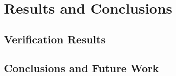 \chapter{Results and Conclusions}
\label{ch:results}

\lipsum[3]

\section{Verification Results}
\label{sec:verification}


\section{Conclusions and Future Work}
\label{sec:conclusions}

